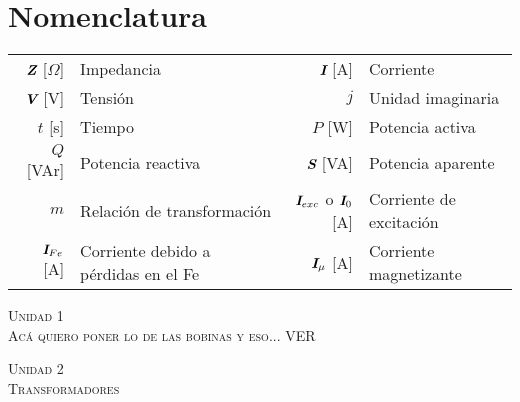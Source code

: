 \documentclass[11pt,a4paper]{article}
\newcommand{\fasor}[1]{\uppercase{\textit{\textbf{#1}}}}
\newcommand{\unidad}[2]{\begin{center}
		\fontsize{10}{10}\selectfont\color{gray!50!black}\scshape Unidad #1 \\
		\fontsize{14}{14}\selectfont \scshape #2
\end{center} \vspace{-.6cm}}
\begin{document}
    \pagestyle{fancy}
    \section*{Nomenclatura}
    \begin{tabular}{r l r l}
		$\fasor{Z}$ [$\Omega$]& Impedancia &
		$\fasor{i}$ [A] & Corriente \\
		$\fasor{v}$ [V] & Tensión&
		$j$ & Unidad imaginaria \\
		$t$ [s] & Tiempo &
		$P$ [W] & Potencia activa \\
		$Q$ [VAr] & Potencia reactiva &
		$\fasor{s}$ [VA] & Potencia aparente \\
        $m$ & Relación de transformación&
        $\fasor{I}_{exc}$ o $\fasor{I}_0$ [A] & Corriente de excitación\\
        $\fasor{I}_{Fe}$ [A] & Corriente debido a pérdidas en el Fe&
        $\fasor{I}_{\mu}$ [A] & Corriente magnetizante\\
	\end{tabular}
    \unidad{1}{Acá quiero poner lo de las bobinas y eso... VER}
    \unidad{2}{Transformadores}
\end{document}
